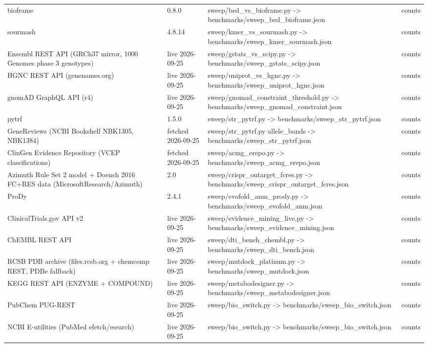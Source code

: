 \begin{center}
\begin{tabular}{lp{1.8cm}p{7.5cm}l}
bioframe & 0.8.0 & sweep/bed\_vs\_bioframe.py -> benchmarks/sweep\_bed\_bioframe.json & counts\\
sourmash & 4.8.14 & sweep/kmer\_vs\_sourmash.py -> benchmarks/sweep\_kmer\_sourmash.json & counts\\
Ensembl REST API (GRCh37 mirror, 1000 Genomes phase 3 genotypes) & live 2026-09-25 & sweep/gstats\_vs\_scipy.py -> benchmarks/sweep\_gstats\_scipy.json & counts\\
HGNC REST API (genenames.org) & live 2026-09-25 & sweep/uniprot\_vs\_hgnc.py -> benchmarks/sweep\_uniprot\_hgnc.json & counts\\
gnomAD GraphQL API (r4) & live 2026-09-25 & sweep/gnomad\_constraint\_threshold.py -> benchmarks/sweep\_gnomad\_constraint.json & counts\\
pytrf & 1.5.0 & sweep/str\_pytrf.py -> benchmarks/sweep\_str\_pytrf.json & counts\\
GeneReviews (NCBI Bookshelf NBK1305, NBK1384) & fetched 2026-09-25 & sweep/str\_pytrf.py allele\_bands -> benchmarks/sweep\_str\_pytrf.json & counts\\
ClinGen Evidence Repository (VCEP classifications) & fetched 2026-09-25 & sweep/acmg\_erepo.py -> benchmarks/sweep\_acmg\_erepo.json & counts\\
Azimuth Rule Set 2 model + Doench 2016 FC+RES data (MicrosoftResearch/Azimuth) & 2.0 & sweep/crispr\_ontarget\_fcres.py -> benchmarks/sweep\_crispr\_ontarget\_fcres.json & counts\\
ProDy & 2.4.1 & sweep/evofold\_anm\_prody.py -> benchmarks/sweep\_evofold\_anm.json & counts\\
ClinicalTrials.gov API v2 & live 2026-09-25 & sweep/evidence\_mining\_live.py -> benchmarks/sweep\_evidence\_mining.json & counts\\
ChEMBL REST API & live 2026-09-25 & sweep/dti\_bench\_chembl.py -> benchmarks/sweep\_dti\_bench.json & counts\\
RCSB PDB archive (files.rcsb.org + chemcomp REST, PDBe fallback) & live 2026-09-25 & sweep/mutdock\_platinum.py -> benchmarks/sweep\_mutdock.json & counts\\
KEGG REST API (ENZYME + COMPOUND) & live 2026-09-25 & sweep/metabodesigner.py -> benchmarks/sweep\_metabodesigner.json & counts\\
PubChem PUG-REST & live 2026-09-25 & sweep/bio\_switch.py -> benchmarks/sweep\_bio\_switch.json & counts\\
NCBI E-utilities (PubMed efetch/esearch) & live 2026-09-25 & sweep/bio\_switch.py -> benchmarks/sweep\_bio\_switch.json & counts\\

\end{tabular}
\end{center}
